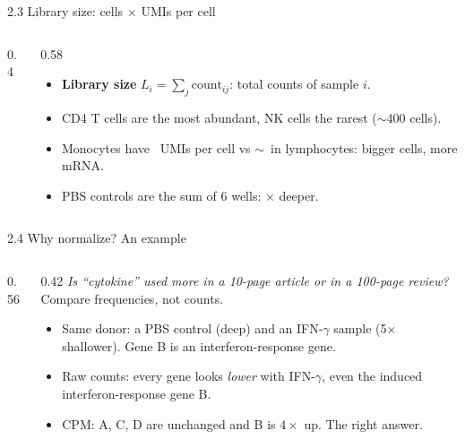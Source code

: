 \begin{frame}{2.3 Library size: cells $\times$ UMIs per cell}
  \centering
  \\[-1pt]
  \begin{columns}[c]
    \begin{column}{0.4\linewidth}
      \centering\scriptsize
      
    \end{column}
    \begin{column}{0.58\linewidth}\footnotesize
      \begin{itemize}\setlength\itemsep{2pt}
        \item \textbf{Library size} $L_i=\sum_j\text{count}_{ij}$: total counts of sample $i$.
        \item CD4 T cells are the most abundant, NK cells the rarest ($\sim$400 cells).
        \item Monocytes have \alert{\numumiMono\ UMIs per cell} vs $\sim$\numumiNK\ in lymphocytes: bigger cells, more mRNA.
        \item PBS controls are the sum of 6 wells: \alert{\numpbsratio$\times$ deeper}.
      \end{itemize}
    \end{column}
  \end{columns}
\end{frame}

\begin{frame}{2.4 Why normalize? An example}
  \begin{columns}[c]
    \begin{column}{0.56\linewidth}
    \end{column}
    \begin{column}{0.42\linewidth}\small
      \textit{Is ``cytokine'' used more in a 10-page article or in a 100-page review?} Compare \alert{frequencies}, not counts.
      \vspace{0.2cm}
      \begin{itemize}\setlength\itemsep{3pt}
        \item Same donor: a PBS control (deep) and an IFN-$\gamma$ sample (5$\times$ shallower). Gene B is an interferon-response gene.
        \item \alert{Raw counts}: every gene looks \emph{lower} with IFN-$\gamma$, even the induced interferon-response gene B.
        \item \alert{CPM}: A, C, D are unchanged and B is $4\times$ up. The right answer.
      \end{itemize}
    \end{column}
  \end{columns}
\end{frame}

